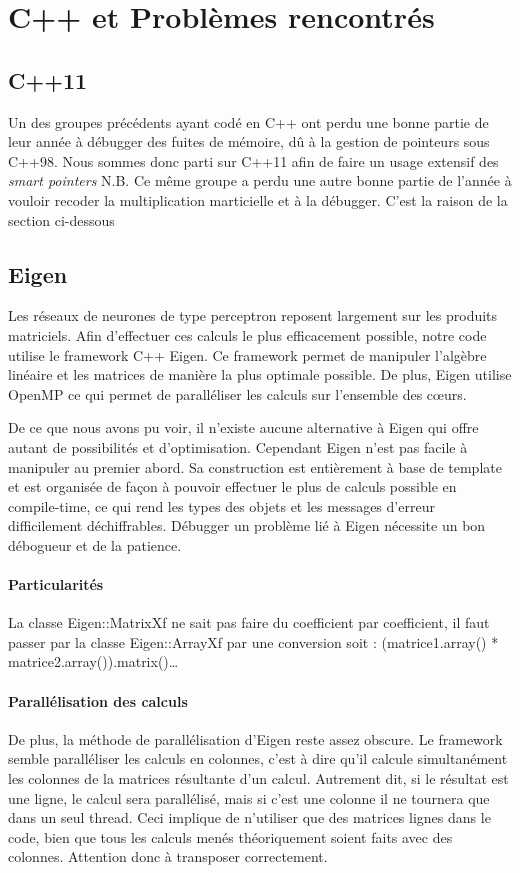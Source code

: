\section{C++ et Problèmes rencontrés}
\subsection{C++11}
Un des groupes précédents \cite{amosse_pinapl_2017} ayant codé en C++ ont perdu une bonne partie de leur année à débugger des fuites de mémoire, dû à la gestion de pointeurs sous C++98. Nous sommes donc parti sur C++11 afin de faire un usage extensif des \textit{smart pointers}
N.B. Ce même groupe a perdu une autre bonne partie de l'année à vouloir recoder la multiplication marticielle et à la débugger. C'est la raison de la section ci-dessous 


\subsection{Eigen}
Les réseaux de neurones de type perceptron reposent largement sur les produits matriciels. Afin d'effectuer ces calculs le plus efficacement possible, notre code utilise le framework C++ Eigen. Ce framework permet de manipuler l'algèbre linéaire et les matrices de manière la plus optimale possible. De plus, Eigen utilise OpenMP ce qui permet de paralléliser les calculs sur l'ensemble des cœurs. 

De ce que nous avons pu voir, il n'existe aucune alternative à Eigen qui offre autant de possibilités et d'optimisation. Cependant Eigen n'est pas facile à manipuler au premier abord. Sa construction est entièrement à base de template et est organisée de façon à pouvoir effectuer le plus de calculs possible en compile-time, ce qui rend les types des objets et les messages d'erreur difficilement déchiffrables. Débugger un problème lié à Eigen nécessite un bon débogueur et de la patience. 

\paragraph{Particularités}
La classe Eigen::MatrixXf ne sait pas faire du coefficient par coefficient, il faut passer par la classe Eigen::ArrayXf par une conversion
soit : (matrice1.array() * matrice2.array()).matrix()…
\paragraph{Parallélisation des calculs}
De plus, la méthode de parallélisation d'Eigen reste assez obscure. Le framework semble paralléliser les calculs en colonnes, c'est à dire qu'il calcule simultanément les colonnes de la matrices résultante d'un calcul. Autrement dit, si le résultat est une ligne, le calcul sera parallélisé, mais si c'est une colonne il ne tournera que dans un seul thread. Ceci implique de n'utiliser que des matrices lignes dans le code, bien que tous les calculs menés théoriquement soient faits avec des colonnes. Attention donc à transposer correctement.
